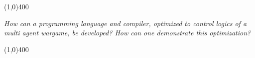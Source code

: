 \begin{center}
\line(1,0){400}
\end{center}

\textit{How can a programming language and compiler, optimized to control logics of a multi agent wargame, be developed? How can one demonstrate this optimization?}

\begin{center}
\line(1,0){400}
\end{center}